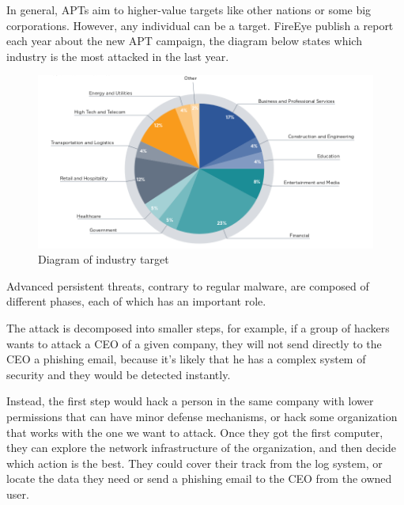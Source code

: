In general, APTs aim to higher-value targets like other nations or some big corporations. However, any individual can be a target. FireEye publish a report each year about the new APT campaign, the diagram below states which industry is the most attacked in the last year.\\

\begin{figure}[!h]
	\centering
	\includegraphics[width=1.0\columnwidth]{graph}
	\caption{Diagram of industry target}
\end{figure}





Advanced persistent threats, contrary to regular malware, are composed of different phases, each of which has an important role. 

The attack is decomposed into smaller steps, for example, if a group of hackers wants to attack a CEO of a given company, they will not send directly to the CEO a phishing email, because it's likely that he has a complex system of security and they would be detected instantly. 

Instead, the first step would hack a person in the same company with lower permissions that can have minor defense mechanisms, or hack some organization that works with the one we want to attack. Once they got the first computer, they can explore the network infrastructure of the organization, and then decide which action is the best.
They could cover their track from the log system, or locate the data they need or send a phishing email to the CEO from the owned user.

